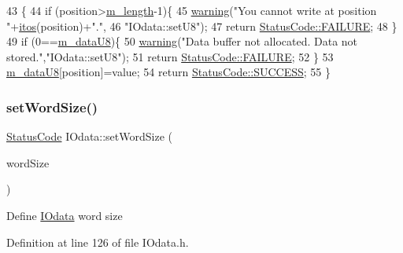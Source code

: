 \begin{DoxyCode}
43                                                             \{
44   \textcolor{keywordflow}{if} (position>\hyperlink{classIOdata_afabe57441da019eb614d277799106aac}{m\_length}-1)\{
45     \hyperlink{classObject_a65cd4fda577711660821fd2cd5a3b4c9}{warning}(\textcolor{stringliteral}{"You cannot write at position "}+\hyperlink{Tools_8h_af330027dbdafb9a30768b3613c553e60}{itos}(position)+\textcolor{stringliteral}{"."},
46         \textcolor{stringliteral}{"IOdata::setU8"});
47     \textcolor{keywordflow}{return} \hyperlink{classStatusCode_a6f565cbeadc76d14c72f047e5e85eb4ba3da73d4c469762eb9d3c960368252b26}{StatusCode::FAILURE};
48   \}
49   \textcolor{keywordflow}{if} (0==\hyperlink{classIOdata_a9c4c0dc5104f7f3b170e30ab78fe61e7}{m\_dataU8})\{
50     \hyperlink{classObject_a65cd4fda577711660821fd2cd5a3b4c9}{warning}(\textcolor{stringliteral}{"Data buffer not allocated. Data not stored."},\textcolor{stringliteral}{"IOdata::setU8"});
51     \textcolor{keywordflow}{return} \hyperlink{classStatusCode_a6f565cbeadc76d14c72f047e5e85eb4ba3da73d4c469762eb9d3c960368252b26}{StatusCode::FAILURE};
52   \}
53   \hyperlink{classIOdata_a9c4c0dc5104f7f3b170e30ab78fe61e7}{m\_dataU8}[position]=value;
54   \textcolor{keywordflow}{return} \hyperlink{classStatusCode_a6f565cbeadc76d14c72f047e5e85eb4badd0da38d3ba0d922efd1f4619bc37ad8}{StatusCode::SUCCESS};
55 \}
\end{DoxyCode}
\mbox{\label{classIOdata_a20f30a9f4673713616447b1b5e9817d5}} 
\subsubsection{\texorpdfstring{set\+Word\+Size()}{setWordSize()}}
{\footnotesize\ttfamily \hyperlink{classStatusCode}{Status\+Code} I\+Odata\+::set\+Word\+Size (\begin{DoxyParamCaption}\item[{\hyperlink{classIOdata_a37c53ebf4bf8d866aac8af572962a84c}{I\+Odata\+::\+Word\+Size}}]{word\+Size }\end{DoxyParamCaption})\hspace{0.3cm}{\ttfamily [inline]}}

Define \hyperlink{classIOdata}{I\+Odata} word size 

Definition at line 126 of file I\+Odata.\+h.



